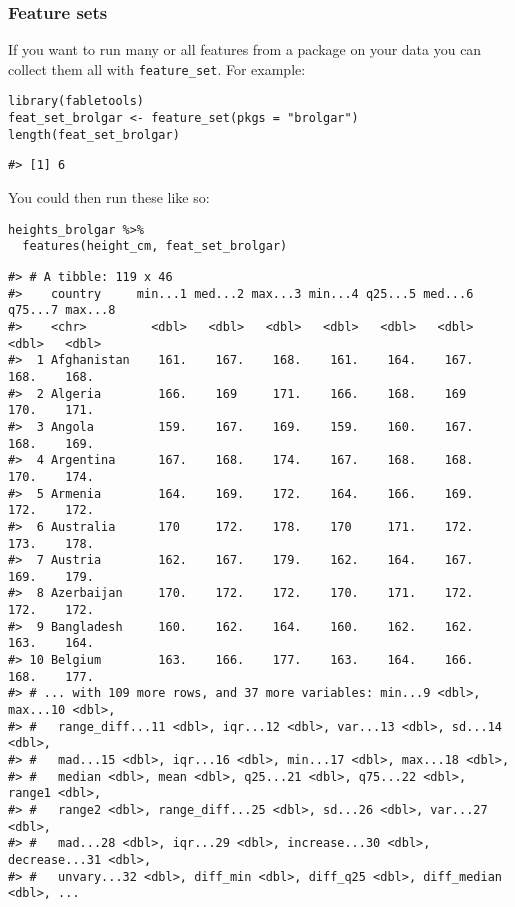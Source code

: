\hypertarget{feature-sets}{%
\subsubsection{Feature sets}\label{feature-sets}}

If you want to run many or all features from a package on your data you can collect them all with \texttt{feature\_set}. For example:

\begin{verbatim}
library(fabletools)
feat_set_brolgar <- feature_set(pkgs = "brolgar")
length(feat_set_brolgar)
\end{verbatim}

\begin{verbatim}
#> [1] 6
\end{verbatim}

You could then run these like so:

\begin{verbatim}
heights_brolgar %>%
  features(height_cm, feat_set_brolgar)
\end{verbatim}

\begin{verbatim}
#> # A tibble: 119 x 46
#>    country     min...1 med...2 max...3 min...4 q25...5 med...6 q75...7 max...8
#>    <chr>         <dbl>   <dbl>   <dbl>   <dbl>   <dbl>   <dbl>   <dbl>   <dbl>
#>  1 Afghanistan    161.    167.    168.    161.    164.    167.    168.    168.
#>  2 Algeria        166.    169     171.    166.    168.    169     170.    171.
#>  3 Angola         159.    167.    169.    159.    160.    167.    168.    169.
#>  4 Argentina      167.    168.    174.    167.    168.    168.    170.    174.
#>  5 Armenia        164.    169.    172.    164.    166.    169.    172.    172.
#>  6 Australia      170     172.    178.    170     171.    172.    173.    178.
#>  7 Austria        162.    167.    179.    162.    164.    167.    169.    179.
#>  8 Azerbaijan     170.    172.    172.    170.    171.    172.    172.    172.
#>  9 Bangladesh     160.    162.    164.    160.    162.    162.    163.    164.
#> 10 Belgium        163.    166.    177.    163.    164.    166.    168.    177.
#> # ... with 109 more rows, and 37 more variables: min...9 <dbl>, max...10 <dbl>,
#> #   range_diff...11 <dbl>, iqr...12 <dbl>, var...13 <dbl>, sd...14 <dbl>,
#> #   mad...15 <dbl>, iqr...16 <dbl>, min...17 <dbl>, max...18 <dbl>,
#> #   median <dbl>, mean <dbl>, q25...21 <dbl>, q75...22 <dbl>, range1 <dbl>,
#> #   range2 <dbl>, range_diff...25 <dbl>, sd...26 <dbl>, var...27 <dbl>,
#> #   mad...28 <dbl>, iqr...29 <dbl>, increase...30 <dbl>, decrease...31 <dbl>,
#> #   unvary...32 <dbl>, diff_min <dbl>, diff_q25 <dbl>, diff_median <dbl>, ...
\end{verbatim}

